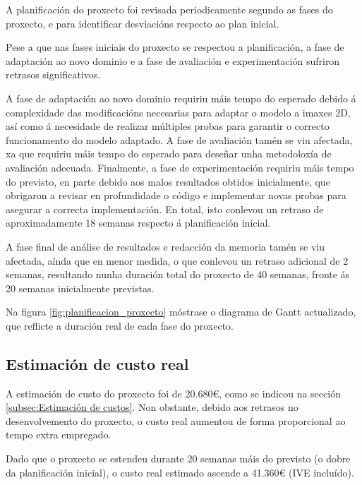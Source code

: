 A planificación do proxecto foi revisada periodicamente segundo as fases do proxecto, e para identificar desviacións respecto ao plan inicial.

Pese a que nas fases iniciais do proxecto se respectou a planificación, a fase de adaptación ao novo dominio e a fase de avaliación e experimentación sufriron retrasos significativos.

A fase de adaptación ao novo dominio requiriu máis tempo do esperado debido á complexidade das modificacións necesarias para adaptar o modelo a imaxes 2D, así como á necesidade de realizar múltiples probas para garantir o correcto funcionamento do modelo adaptado. A fase de avaliación tamén se viu afectada, xa que requiriu máis tempo do esperado para deseñar unha metodoloxía de avaliación adecuada. Finalmente, a fase de experimentación requiriu máis tempo do previsto, en parte debido aos malos resultados obtidos inicialmente, que obrigaron a revisar en profundidade o código e implementar novas probas para asegurar a correcta implementación.
En total, isto conlevou un retraso de aproximadamente 18 semanas respecto á planificación inicial.

A fase final de análise de resultados e redacción da memoria tamén se viu afectada, aínda que en menor medida, o que conlevou un retraso adicional de 2 semanas, resultando nunha duración total do proxecto de 40 semanas, fronte ás 20 semanas inicialmente previstas.

Na figura \ref{fig:planificacion_proxecto} móstrase o diagrama de Gantt actualizado, que reflicte a duración real de cada fase do proxecto.

\subsection{Estimación de custo real}
\label{subsec:Estimación de custo real}

A estimación de custo do proxecto foi de 20.680€, como se indicou na sección \ref{subsec:Estimación de custos}. Non obstante, debido aos retrasos no desenvolvemento do proxecto, o custo real aumentou de forma proporcional ao tempo extra empregado.

Dado que o proxecto se estendeu durante 20 semanas máis do previsto (o dobre da planificación inicial), o custo real estimado ascende a 41.360€ (IVE incluído).